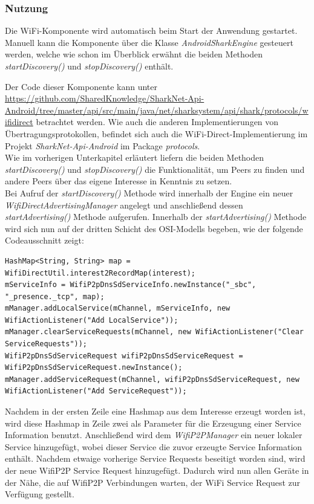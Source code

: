 \subsubsection{Nutzung}
Die WiFi-Komponente wird automatisch beim Start der Anwendung gestartet. Manuell kann die Komponente über die Klasse \textit{AndroidSharkEngine} gesteuert werden, welche wie schon im Überblick erwähnt die beiden Methoden \textit{startDiscovery()} und \textit{stopDiscovery()} enthält.


Der Code dieser Komponente kann unter \url{https://github.com/SharedKnowledge/SharkNet-Api-Android/tree/master/api/src/main/java/net/sharksystem/api/shark/protocols/wifidirect} betrachtet werden. Wie auch die anderen Implementierungen von Über\-tra\-gungs\-pro\-to\-kol\-len, befindet sich auch die WiFi-Direct-Implementierung im Projekt \textit{SharkNet-Api-Android} im Package \textit{protocols}.
\\Wie im vorherigen Unterkapitel erläutert liefern die beiden Methoden \textit{startDiscovery()} und \textit{stopDiscovery()} die Funktionalität, um Peers zu finden und andere Peers über das eigene Interesse in Kenntnis zu setzen. 
\\Bei Aufruf der \textit{startDiscovery()} Methode wird innerhalb der Engine ein neuer \textit{WifiDirectAdvertisingManager} angelegt und anschließend dessen \textit{startAdvertising()} Methode aufgerufen. Innerhalb der \textit{startAdvertising()} Methode wird sich nun auf der dritten Schicht des OSI-Modells begeben, wie der folgende Codeausschnitt zeigt:\newline
\lstset{language=Java, caption=Hinzufügung des Services, label=DescriptiveLabel, numbers=left, numbersep=1em, breaklines=true, basicstyle=\small}
\begin{lstlisting}
HashMap<String, String> map = WifiDirectUtil.interest2RecordMap(interest);
mServiceInfo = WifiP2pDnsSdServiceInfo.newInstance("_sbc", "_presence._tcp", map);
mManager.addLocalService(mChannel, mServiceInfo, new WifiActionListener("Add LocalService"));
mManager.clearServiceRequests(mChannel, new WifiActionListener("Clear ServiceRequests"));
WifiP2pDnsSdServiceRequest wifiP2pDnsSdServiceRequest = WifiP2pDnsSdServiceRequest.newInstance();
mManager.addServiceRequest(mChannel, wifiP2pDnsSdServiceRequest, new WifiActionListener("Add ServiceRequest"));
\end{lstlisting}
Nachdem in der ersten Zeile eine Hashmap aus dem Interesse erzeugt worden ist, wird diese Hashmap in Zeile zwei als Parameter für die Erzeugung einer Service Information benutzt. Anschließend wird dem \textit{WifiP2PManager} ein neuer lokaler Service hinzugefügt, wobei dieser Service die zuvor erzeugte Service Information enthält. Nachdem etwaige vorherige Service Requests beseitigt worden sind, wird der neue WifiP2P Service Request hinzugefügt. Dadurch wird nun allen Geräte in der Nähe, die auf WifiP2P Verbindungen warten, der WiFi Service Request zur Verfügung gestellt.

